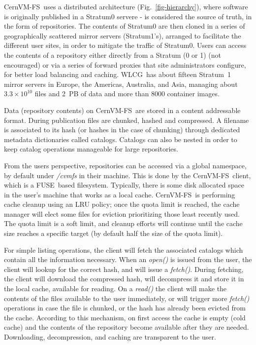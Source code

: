 \documentclass{webofc}
\newcommand{\cvmfs}{CernVM-FS}
\newcommand{\fuse}{FUSE}
\newcommand{\wlcg}{WLCG}
\begin{document}
\cvmfs\ uses a distributed architecture (Fig.~\ref{fig-hierarchy}), where software is originally published in a Stratum0 servere - is considered the source of truth, in the form of repositories.
The contents of Stratum0 are then cloned in a series of geographically scattered mirror servers (Stratum1's), arranged to facilitate the different user sites, in order to mitigate the traffic of Stratum0.
Users can access the contents of a repository either directly from a Stratum (0 or 1) (not encouraged) or via a series of forward proxies that site administrators configure, for better load balancing and caching.
\wlcg\ has about fifteen Stratum~1 mirror servers in Europe, the Americas, Australia, and Asia, managing about $3.3\times10^{10}$ files
and 2~PB of data and more than 8000 container images.

Data (repository contents) on \cvmfs\ are stored in a content addressable format.
During publication files are chunked, hashed and compressed.
A filename is associated to its hash (or hashes in the case of chunking) through dedicated metadata dictionaries called catalogs.
Catalogs can also be nested in order to keep catalog operations manageable for large repositories.

From the users perspective, repositories can be accessed via a global namespace, by default under  \emph{/cvmfs} in their machine.
This is done by the \cvmfs\ client, which is a \fuse\ based filesystem.
Typically, there is some disk allocated space in the user's machine that works as a local cache.
\cvmfs\ is performing cache cleanup using an LRU policy; once the quota limit is reached, the cache manager will elect some files for eviction prioritizing those least recently used.
The quota limit is a soft limit, and cleanup efforts will continue until the cache size reaches a specific target (by default half the size of the quota limit). 

For simple listing operations, the client will fetch the associated catalogs which contain all the information necessary.
When an \emph{open()}  is issued from the user, the client will lookup for the correct hash, and will issue a \emph{fetch()}.
During fetching, the client will download the compressed hash, will decompress it and store it in the local cache, available for reading.
On a \emph{read()} the client will make the contents of the files available to the user immediately, or will trigger more \emph{fetch()} operations in case the file is chunked, or the hash has already been evicted from the cache.
According to this mechanism, on first access the cache is empty (cold cache) and the contents of the repository become available after they are needed.
Downloading, decompression, and caching are transparent to the user.
\end{document}
